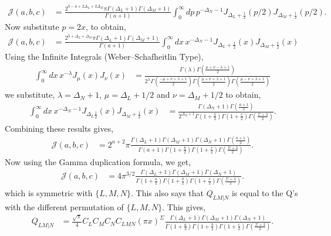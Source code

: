 \documentclass[11pt]{article}
\newcommand{\lb}{\left(}
\newcommand{\rb}{\right)}
\begin{document}
\begin{align}
    \mathcal{J}(a,b,c)&=\frac{2^{3-a +2\Delta_L + 2\Delta_M}\pi \Gamma(\Delta_L +1)\Gamma(\Delta_M+1)}{\Gamma(a+1)}\int_0^\infty dp \,p^{-\Delta_N - 1} J_{\Delta_L + \frac{1}{2}}(p/2) J_{\Delta_M+\frac{1}{2}}(p/2).
\end{align}
Now substitute $p=2x$, to obtain,
\begin{align}
    \mathcal{J}(a,b,c)&= \frac{2^{3+\Delta_L + \Delta_M}\pi \Gamma(\Delta_L +1)\Gamma(\Delta_M+1)}{\Gamma(a+1)} \int_0^\infty dx\, x^{-\Delta_N -1} J_{\Delta_L + \frac{1}{2}}(x)J_{\Delta_M + \frac{1}{2}}(x)
\end{align}
Using the Infinite Integrals (Weber–Schafheitlin Type),
\begin{align}
    \int_0^\infty dx \, x^{-\lambda} J_\mu(x) J_\nu(x) &= \frac{\Gamma(\lambda) \Gamma\lb \frac{\mu + \nu -\lambda +1}{2}\rb}{2^\lambda \Gamma\lb \frac{-\mu + \nu +\lambda +1}{2}\rb\Gamma\lb \frac{\mu + \nu +\lambda +1}{2}\rb\Gamma\lb \frac{\mu - \nu +\lambda +1}{2}\rb}
\end{align}
we substitute, $\lambda = \Delta_N +1$, $\mu = \Delta_L +1/2$ and $\nu = \Delta_M + 1/2$ to obtain,
\begin{align}
    \int_0^\infty dx\, x^{-\Delta_N-1} J_{\Delta_L \frac{1}{2}}(x)J_{\Delta_M + \frac{1}{2}}(x) &= \frac{\Gamma(\Delta_N + 1)\Gamma\lb \frac{a+1}{2}\rb}{2^{\Delta_N + 1}\Gamma\lb 1+\frac{b}{2}\rb\Gamma\lb 1+\frac{c}{2}\rb\Gamma\lb \frac{\Sigma+3}{2}\rb}.
\end{align}
Combining these results gives,
\begin{align}
    \mathcal{J}(a,b,c)&= 2^{a+2}\pi \frac{\Gamma(\Delta_L + 1)\Gamma(\Delta_M + 1)\Gamma(\Delta_N + 1)\Gamma\lb\frac{a+1}{2}\rb}{\Gamma(a + 1)\Gamma\lb 1+ \frac{b}{2}\rb\Gamma\lb 1+ \frac{c}{2}\rb\Gamma\lb  \frac{\Sigma + 3}{2}\rb}.
\end{align}
Now using the Gamma duplication formula, we get,
\begin{align}
    \mathcal{J}(a,b,c)&= 4\pi^{3/2} \frac{\Gamma(\Delta_L + 1)\Gamma(\Delta_M + 1)\Gamma(\Delta_N + 1)}{\Gamma\lb 1+ \frac{a}{2}\rb\Gamma\lb 1+ \frac{b}{2}\rb\Gamma\lb 1+ \frac{c}{2}\rb\Gamma\lb  \frac{\Sigma + 3}{2}\rb}.
\end{align}
which is symmetric with $\{L,M,N\}$. This also says that $Q_{LM|N}$ is equal to the Q's with the different permutation of $\{L,M,N\}$.
This gives,
\begin{align}
    Q_{LM|N}&= \frac{\sqrt \pi}{4}C_LC_MC_NC_{LMN} (\pi x)^{\Sigma}\frac{\Gamma(\Delta_L + 1)\Gamma(\Delta_M + 1)\Gamma(\Delta_N + 1)}{\Gamma\lb 1+ \frac{a}{2}\rb\Gamma\lb 1+ \frac{b}{2}\rb\Gamma\lb 1+ \frac{c}{2}\rb\Gamma\lb  \frac{\Sigma + 3}{2}\rb}. 
\end{align}
\end{document}
